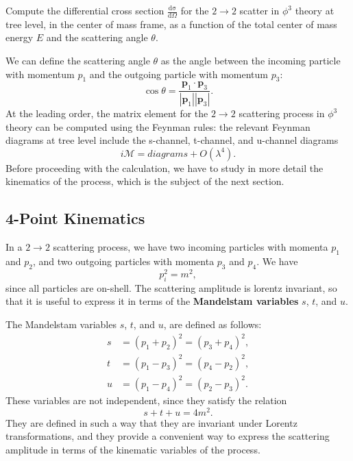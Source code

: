 \begin{example}[EXERCISE]
    Compute the differential cross section \(\tfrac{\mathrm{d\sigma}}{\mathrm{d} \Omega}\) for the \(2 \to 2\) scatter in \(\phi^3\) theory at tree level, in the center of mass frame, as a function of the total center of mass energy \(E\) and the scattering angle \(\theta\).
\end{example}

\begin{example}
    We can define the scattering angle \(\theta\) as the angle between the incoming particle with momentum \(p_1\) and the outgoing particle with momentum \(p_3\):
    \[
        \cos \theta = \frac{\mathbf{p}_1 \cdot \mathbf{p}_3}{|\mathbf{p}_1||\mathbf{p}_3|}.
    \]
    At the leading order, the matrix element for the \(2 \to 2\) scattering process in \(\phi^3\) theory can be computed using the Feynman rules: the relevant Feynman diagrams at tree level include the s-channel, t-channel, and u-channel diagrams
    \[
        i \mathcal{M} = diagrams + O(\lambda^4).
    \]
    Before proceeding with the calculation, we have to study in more detail the kinematics of the process, which is the subject of the next section.
\end{example}

\subsection{4-Point Kinematics}

In a \(2 \to 2\) scattering process, we have two incoming particles with momenta \(p_1\) and \(p_2\), and two outgoing particles with momenta \(p_3\) and \(p_4\). We have
\[
    p_i^2 = m^2,
\]
since all particles are on-shell. The scattering amplitude is lorentz invariant, so that it is useful to express it in terms of the \textbf{Mandelstam variables} \(s\), \(t\), and \(u\).

\begin{definition}
    The Mandelstam variables \(s\), \(t\), and \(u\), are defined as follows:
    \[
        \begin{aligned}
            s & = (p_1 + p_2)^2 = (p_3 + p_4)^2, \\
            t & = (p_1 - p_3)^2 = (p_4 - p_2)^2, \\
            u & = (p_1 - p_4)^2 = (p_2 - p_3)^2.
        \end{aligned}
    \]
    These variables are not independent, since they satisfy the relation
    \[
        s + t + u = 4m^2.
    \]
    They are defined in such a way that they are invariant under Lorentz transformations, and they provide a convenient way to express the scattering amplitude in terms of the kinematic variables of the process.
\end{definition}

